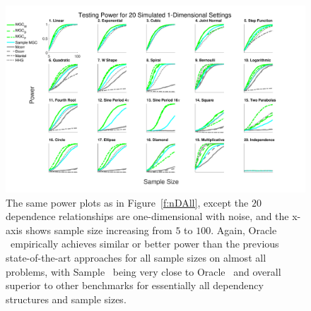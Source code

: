 \documentclass[11pt]{extarticle}
\begin{document}
\begin{figure}[htbp]
\includegraphics[width=1.0\textwidth,trim={0 0.5cm 3.2cm 0},clip]{Figures/Fig1DPowerAll}
\caption{
The same power plots as in Figure~\ref{f:nDAll}, except the $20$ dependence relationships are one-dimensional with noise, and the x-axis shows sample size increasing from $5$ to $100$.
Again, Oracle \Mgc~empirically achieves similar or better power than the previous state-of-the-art approaches for all sample sizes on almost all problems, with Sample \Mgc~being very close to Oracle \Mgc~and overall superior to other benchmarks for essentially all dependency structures and sample sizes.}
\label{f:1DAll}
\end{figure}
\end{document}
